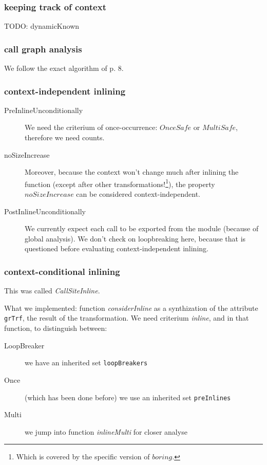 \documentclass{article}
\begin{document}
\subsubsection{keeping track of context}
TODO: dynamicKnown

\subsubsection{call graph analysis}
We follow the exact algorithm of p. 8.

\subsubsection{context-independent inlining}
\begin{description}
\item[PreInlineUnconditionally] We need the criterium of once-occurrence: $OnceSafe$ or $MultiSafe$, therefore we need counts.
\item[noSizeIncrease] Moreover, because the \grin context won't change much after inlining the function (except after other transformations!\footnote{Which is covered by the \grin specific version of $boring$.}), the property $noSizeIncrease$ can be considered context-independent.
\item[PostInlineUnconditionally] We currently expect each call to be exported from the module (because of global analysis). We don't check on loopbreaking here, because that is questioned before evaluating context-independent inlining.
\end{description}

\subsubsection{context-conditional inlining}
This was called \emph{CallSiteInline}.

What we implemented: function \emph{considerInline} as a synthization of the attribute \texttt{grTrf}, the result of the transformation. We need criterium \emph{inline}, and in that function, to distinguish between:
\begin{description}
\item[LoopBreaker] we have an inherited set \texttt{loopBreakers}
\item[Once] (which has been done before) we use an inherited set \texttt{preInlines}
\item[Multi] we jump into function \emph{inlineMulti} for closer analyse 
\end{description}
\end{document}
